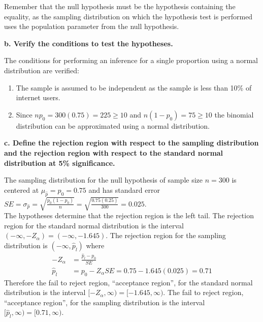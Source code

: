 \documentclass{article}
\begin{document}
Remember that the null hypothesis must be the hypothesis containing the equality, 
as the sampling distribution on which the hypothesis test is performed uses the population parameter from the null hypothesis.\\
\vspace{0.1in}

\textbf{b. Verify the conditions to test the hypotheses.}

The conditions for performing an inference for a single proportion using a normal distribution are verified:
\vspace{0.1in}
\begin{enumerate}
\item The sample is assumed to be independent as the sample is less than 10\% of internet users.
\item Since $np_0=300(0.75)=225\geq10$ and $n(1-p_0)=75\geq10$ the binomial distribution can be approximated using a normal distribution.
\end{enumerate}
\vspace{0.1in}

\textbf{c. Define the rejection region with respect to the sampling distribution and the rejection region with respect to the standard normal distribution at 5\% significance.}

The sampling distribution for the null hypothesis of sample size $n=300$ is 
centered at $\mu_{\hat{p}}=p_0=0.75$ and has standard error 
$SE=\sigma_{\hat{p}}=\sqrt{\frac{p_0(1-p_0)}{n}}=\sqrt{\frac{0.75(0.25)}{300}}=0.025$.\\

The hypotheses determine that the rejection region is the left tail.  The rejection region for the standard normal distribution is the interval $(-\infty, -Z_\alpha)=(-\infty, -1.645)$. The rejection region for the sampling distribution is $(-\infty,\hat{p}_l)$ where 
\begin{align*}
-Z_\alpha & = \frac{\hat{p}_l - p_0}{SE}\\
\hat{p}_l & = p_0 - Z_\alpha SE = 0.75 - 1.645(0.025) = 0.71
\end{align*} 
Therefore the fail to reject region, ``acceptance region'', for the standard normal distribution is the interval $[-Z_\alpha, \infty)=[-1.645,\infty)$.  The fail to reject region, ``acceptance region'', for the sampling distribution is the interval $[\hat{p}_l, \infty)=[0.71,\infty)$.
\end{document}
